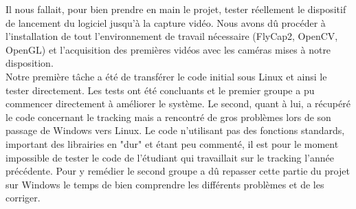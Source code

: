 Il nous fallait, pour bien prendre en main le projet, tester réellement le dispositif de lancement du logiciel jusqu'à la capture vidéo. Nous avons dû  procéder à l'installation de tout l'environnement de travail nécessaire (FlyCap2, OpenCV, OpenGL) et l’acquisition des premières vidéos avec les caméras mises à notre disposition. \\

Notre première tâche a été de transférer le code initial sous Linux et ainsi le tester directement. Les tests ont été concluants et le premier groupe a pu commencer directement à améliorer le système. Le second, quant à lui, a récupéré le code concernant le tracking mais a rencontré de gros problèmes lors de son passage de Windows vers Linux.
Le code n'utilisant pas des fonctions standards, important des librairies en "dur" et étant peu commenté, il est pour le moment impossible de tester le code de l'étudiant qui travaillait sur le tracking l'année précédente. Pour y remédier le second groupe a dû repasser cette partie du projet sur Windows le temps de bien comprendre les différents problèmes et de les corriger.

